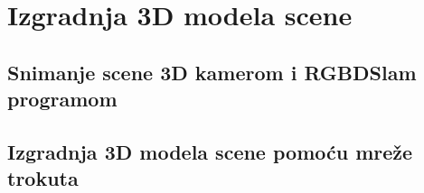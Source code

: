 \newpage

\section{Izgradnja 3D modela scene} %
\label{sec:Izgradnja 3D modela scene}

\subsection{Snimanje scene 3D kamerom i RGBDSlam programom} %
\label{ssub:Snimanje scene 3D kamerom i RGBDSlam programom}

\subsection{Izgradnja 3D modela scene pomoću mreže trokuta} %
\label{ssub:Izgradnja 3D modela scene pomoću mreže trokuta}


